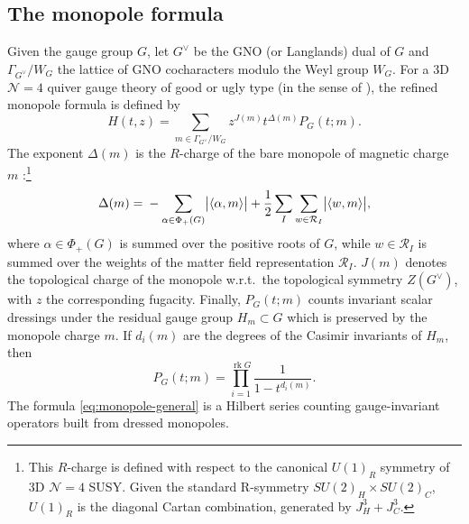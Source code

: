 \documentclass[12pt,a4paper]{article}
\begin{document}
\subsection{The monopole formula}
\label{subsec:review-monopole}

Given the gauge group $G$, let ${G^\vee}$ be the GNO (or Langlands) dual of $G$ and $\Gamma_{G^\vee}/W_G$ the lattice of GNO
cocharacters modulo the Weyl group $W_G$.  For a 3D $\mathcal N=4$ quiver gauge theory of good or ugly type (in the sense of \cite{GaiottoWitten2009}), the refined
monopole formula \cite{CremonesiHananyZaffaroni2014} is defined by
\begin{equation}
 H(t,z)
 =\sum_{m\in\Gamma_{G^\vee}/W_G}
 z^{J(m)}t^{\Delta(m)}P_G(t;m).
 \label{eq:monopole-general}
\end{equation}
The exponent $\Delta(m)$ is the $R$-charge of the bare monopole of
magnetic charge $m$ \cite{GaiottoWitten2009,Benna:2009xd,Bashkirov:2010kz}
:\footnote{\label{fn:u1r}This $R$-charge is defined with respect to the canonical $U(1)_R$ symmetry of 3D $\mathcal N=4$ SUSY. Given the standard R-symmetry $SU(2)_H\times SU(2)_C$, $U(1)_R$ is the diagonal Cartan combination, generated by $J^3_H+J^3_C$.}
\begin{equation}
    \Delta(m)={}-\sum_{\alpha\in\Phi_+(G)}
       \bigl|\langle\alpha,m\rangle\bigr| \\
  +\frac12\sum_I\sum_{w\in\mathcal R_I}
       \bigl|\langle w,m\rangle\bigr|,
\end{equation}
where $\alpha\in\Phi_+(G)$ is summed over the positive roots of $G$, while $w\in\mathcal R_I$ is summed over the weights of the matter field representation $\mathcal R_I$.
$J(m)$ denotes the topological charge of the monopole w.r.t.\ the topological symmetry $Z(G^\vee)$, with $z$ the corresponding fugacity. 
Finally, $P_G(t;m)$
counts invariant scalar dressings under the residual gauge group $H_m\subset G$ which is preserved by the monopole charge $m$.
If $d_i(m)$ are the degrees of the Casimir invariants of $H_m$, then
\begin{equation}
 P_G(t;m)=\prod_{i=1}^{\operatorname{rk}G}\frac{1}{1-t^{d_i(m)}}.
 \label{eq:monopole-dressing-general}
\end{equation}
The formula \eqref{eq:monopole-general} is a Hilbert series counting gauge-invariant operators built from dressed monopoles.

\medskip
\end{document}
